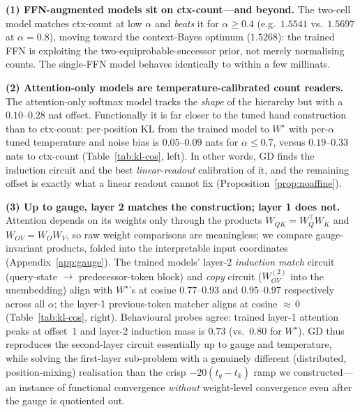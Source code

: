 \documentclass{article} %
\newcommand{\ctxcount}{\textsf{ctx-count}}
\newcommand{\ctxbayes}{\textsf{context-Bayes}}
\newcommand{\Wstar}{W^{\star}}
\newcommand{\WQK}{W_{QK}}
\newcommand{\WOV}{W_{OV}}
\begin{document}
\textbf{(1) FFN-augmented models sit on \ctxcount{}---and beyond.} The two-cell model
matches \ctxcount{} at low $\alpha$ and \emph{beats} it for $\alpha\ge0.4$ (e.g.\
$1.5541$ vs.\ $1.5697$ at $\alpha=0.8$), moving toward the \ctxbayes{} optimum
($1.5268$): the trained FFN is exploiting the two-equiprobable-successor prior, not
merely normalising counts. The single-FFN model behaves identically to within a few
millinats.

\textbf{(2) Attention-only models are temperature-calibrated count readers.} The
attention-only softmax model tracks the \emph{shape} of the hierarchy but with a
$0.10$--$0.28$ nat offset. Functionally it is far closer to the tuned hand
construction than to \ctxcount{}: per-position KL from the trained model to
$\Wstar$ with per-$\alpha$ tuned temperature and noise bias is $0.05$--$0.09$ nats
for $\alpha\le0.7$, versus $0.19$--$0.33$ nats to \ctxcount{}
(Table~\ref{tab:kl-cos}, left). In other words, GD finds the induction circuit and
the best \emph{linear-readout} calibration of it, and the remaining offset is exactly
what a linear readout cannot fix (Proposition~\ref{prop:noaffine}).

\textbf{(3) Up to gauge, layer 2 matches the construction; layer 1 does not.}
Attention depends on its weights only through the products
$\WQK=W_Q^\top W_K$ and $\WOV=W_OW_V$, so raw weight comparisons are meaningless;
we compare gauge-invariant products, folded into the interpretable input coordinates
(Appendix~\ref{app:gauge}). The trained models' layer-2 \emph{induction match}
circuit (query-state $\to$ predecessor-token block) and \emph{copy} circuit
($\WOV^{(2)}$ into the unembedding) align with $\Wstar$'s at cosine $0.77$--$0.93$
and $0.95$--$0.97$ respectively across all $\alpha$; the layer-1 previous-token
matcher aligns at cosine ${\approx}\,0$ (Table~\ref{tab:kl-cos}, right). Behavioural
probes agree: trained layer-1 attention peaks at offset~$1$ and layer-2 induction
mass is $0.73$ (vs.\ $0.80$ for $\Wstar$). GD thus reproduces the second-layer
circuit essentially up to gauge and temperature, while solving the first-layer
sub-problem with a genuinely different (distributed, position-mixing) realisation
than the crisp $-20(t_q{-}t_k)$ ramp we constructed---an instance of functional
convergence \emph{without} weight-level convergence even after the gauge is
quotiented out.
\end{document}
